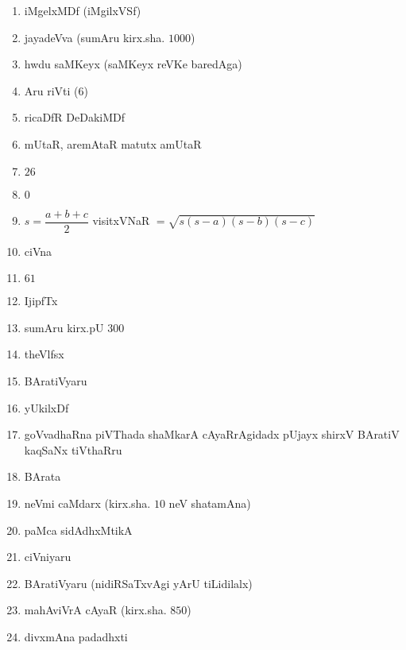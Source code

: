 \begin{enumerate}
\item iMgelxMDf (iMgilxVSf)

\item jayadeVva (sumAru kirx.sha. $1000$)

\item hwdu saMKeyx (saMKeyx reVKe baredAga)

\item Aru riVti ($6$)

\item ricaDfR DeDakiMDf

\item mUtaR, aremAtaR matutx amUtaR 

\item $26$

\item $0$

\item $s= \dfrac{a+b+c}{2}$ \quad visitxVNaR $=\sqrt{s(s-a)(s-b)(s-c)}$

\item ciVna

\item $61$

\item IjipfTx

\item sumAru kirx.pU $300$

\item theVlfsx

\item BAratiVyaru

\item yUkilxDf

\item goVvadhaRna piVThada shaMkarA cAyaRrAgidadx pUjayx shirxV BAratiV kaqSaNx tiVthaRru

\item BArata

\item neVmi caMdarx (kirx.sha. $10$ neV shatamAna)

\item paMca sidAdhxMtikA

\item ciVniyaru

\item BAratiVyaru (nidiRSaTxvAgi yArU tiLidilalx)

\item mahAviVrA cAyaR (kirx.sha. $850$)

\item divxmAna padadhxti


\end{enumerate}
